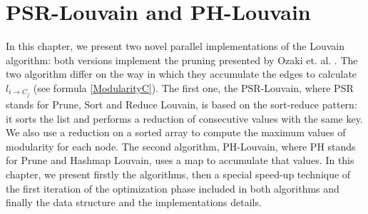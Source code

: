 \section{PSR-Louvain and PH-Louvain}\label{GPUalg}
In this chapter, we present two novel parallel implementations of the Louvain algorithm: both versions implement the pruning presented by Ozaki et. al. \cite{pruning}.  The two algorithm differ on the way in which they accumulate the edges to calculate $l_{i\rightarrow C_j}$  (see formula \ref{ModularityC}). The first one, the PSR-Louvain, where PSR stands for Prune, Sort and Reduce Louvain, is based on the sort-reduce pattern: it sorts the list and performs a reduction of consecutive values with the same key. We also use a reduction on a sorted array to compute the maximum values of modularity for each node. 
The second algorithm, PH-Louvain, where PH stands for Prune and Hashmap Louvain, uses a map to accumulate that values.
In this chapter, we present firstly the algorithms, then a special speed-up technique of the first iteration of the optimization phase included in both algorithms and finally the data structure and the implementations details.


